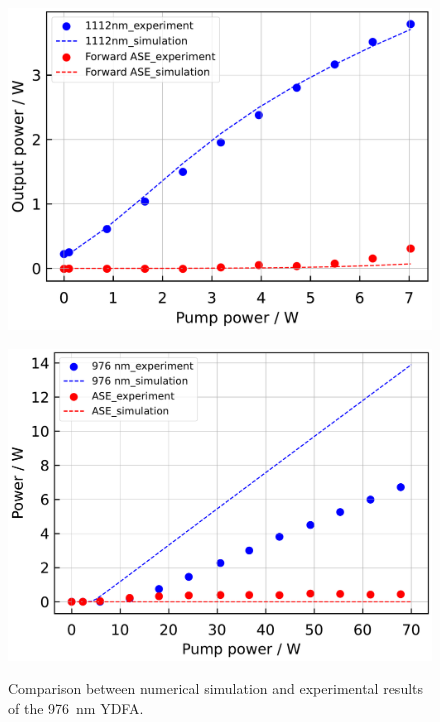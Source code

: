 \documentclass{osa-article}
\begin{document}
\begin{figure}[h!]
  \begin{minipage}[b]{0.5\linewidth}
    \centering
    \includegraphics[keepaspectratio, width=0.9\linewidth]{./Figure/1112nmYDFA2ndStageOutput_ComparisonBetweenSimAndExp.pdf}
    \subcaption{}
    \label{fig:ComparisonBetweenSimAndExpOf1112YDFA}
  \end{minipage}
  \begin{minipage}[b]{0.5\linewidth}
    \centering
    \includegraphics[keepaspectratio, width=0.9\linewidth]{./Figure/CompareSimAndExp_Yb1200-20-125DC-PM438mm_915Pump976Seed0.24W.pdf}
    \subcaption{}
    \label{fig:ComparisonBetweenSimAndExpOf976YDFA}
  \end{minipage}
  \caption{Comparison between numerical simulation and experimental results of the \SI{976}{\nm} YDFA.}
  \label{fig:ComparisonBetweenSimAndExpOfYDFA}
\end{figure}
\end{document}

